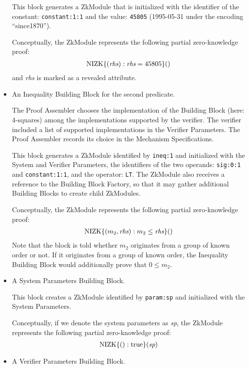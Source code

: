 \begin{itemize}
This block generates a ZkModule that is initialized with the identifier of
the constant: \texttt{constant:1:1} and the value: \texttt{45805} (1995-05-31 under the encoding ``since1870'').

Conceptually, the ZkModule represents
the following partial zero-knowledge proof:
\begin{align}
\operatorname{NIZK}\lbrace(\emph{rhs}): \emph{rhs} = 45805\rbrace()
\end{align}
and \emph{rhs} is marked as a revealed attribute.

\item An Inequality Building Block for the second predicate.

The Proof Assembler chooses the implementation of the Building Block (here: 4-squares)
among the implementations supported by the verifier. The verifier included a list of
supported implementations in the Verifier Parameters. The Proof Assembler records its choice in
the Mechanism Specifications.

This block generates a ZkModule identified by \texttt{ineq:1} and initialized with the System and Verifier Parameters,
the identifiers of the two operands: \texttt{sig:0:1} and \texttt{constant:1:1}, and the operator: \texttt{LT}.
The ZkModule also receives a reference to the Building Block Factory, so that it may
gather additional Building Blocks to create child ZkModules.

Conceptually, the ZkModule represents
the following partial zero-knowledge proof:
\begin{align}
\operatorname{NIZK}\lbrace(m_2, \emph{rhs}): m_2 \leq \emph{rhs}\rbrace()
\end{align}
Note that the block is told whether $m_2$ originates from a group of known order or not.
If it originates from a group of known order, the Inequality Building Block would additionally
prove that $0\leq m_2$.

\item A System Parameters Building Block.

This block creates a ZkModule identified by \texttt{param:sp} and initialized with the System Parameters.

Conceptually, if we denote the system parameters as \emph{sp}, the ZkModule represents
the following partial zero-knowledge proof:
\begin{align}
\operatorname{NIZK}\lbrace(): \operatorname{true}\rbrace(\emph{sp})
\end{align}

\item A Verifier Parameters Building Block.


\end{itemize}

